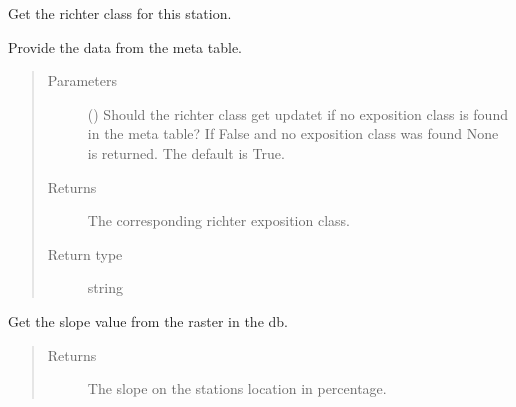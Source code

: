 \documentclass[letterpaper,10pt,english]{sphinxmanual}
\begin{document}
\begin{fulllineitems}

\begin{fulllineitems}
\label{\detokenize{weatherDB:weatherDB.station.PrecipitationStation.get_richter_class}}
\sphinxAtStartPar
Get the richter class for this station.

\sphinxAtStartPar
Provide the data from the meta table.
\begin{quote}\begin{description}
\item[{Parameters}] \leavevmode
\sphinxAtStartPar
{} (\sphinxstyleliteralemphasis{\sphinxupquote{, }}) \textendash{} Should the richter class get updatet if no exposition class is found in the meta table?
If False and no exposition class was found None is returned.
The default is True.

\item[{Returns}] \leavevmode
\sphinxAtStartPar
The corresponding richter exposition class.

\item[{Return type}] \leavevmode
\sphinxAtStartPar
string

\end{description}\end{quote}

\end{fulllineitems}


\begin{fulllineitems}
\label{\detokenize{weatherDB:weatherDB.station.PrecipitationStation.get_slope}}
\sphinxAtStartPar
Get the slope value from the raster in the db.
\begin{quote}\begin{description}
\item[{Returns}] \leavevmode
\sphinxAtStartPar
The slope on the stations location in percentage.


\end{description}
\end{quote}
\end{fulllineitems}
\end{fulllineitems}
\end{document}
